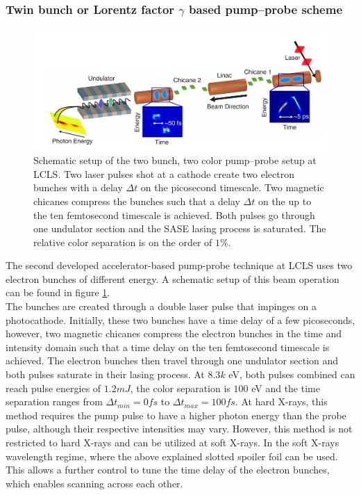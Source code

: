 \subsubsection{Twin bunch or Lorentz factor $\gamma$ based pump--probe scheme}
\begin{figure}
	\centering
		\includegraphics[width=1.00\textwidth]{images/Agos-pump-probe-scheme.png}
	\caption{Schematic setup of the two bunch, two color pump--probe setup at LCLS. Two laser pulses shot at a cathode create two electron bunches with a delay $\Delta t$ on the picosecond timescale. Two magnetic chicanes compress the bunches such that a delay $\Delta t$ on the up to the ten femtosecond timescale is achieved. Both pulses go through one undulator section and the SASE lasing process is saturated. The relative color separation is on the order of $1\%$.}
	\label{fig:Agos-pump-probe-scheme}
\end{figure}
The second developed accelerator-based pump-probe technique at LCLS \cite{Marinelli-2015-NatComm} uses two electron bunches of different energy. A schematic setup of this beam operation can be found in figure \ref{fig:Agos-pump-probe-scheme}.\\
The bunches are created through a double laser pulse that impinges on a photocathode. Initially, these two bunches have a time delay of a few picoseconds, however, two magnetic chicanes compress the electron bunches in the time and intensity domain such that a time delay on the ten femtosecond timescale is achieved. The electron bunches then travel through one undulator section and both pulses saturate in their lasing process. At $8.3k$ eV, both pulses combined can reach pulse energies of $1.2mJ$, the color separation is $100$ eV and the time separation ranges from $\Delta t_{min}=0fs$ to $\Delta t_{max}=100fs$. At hard X-rays, this method requires the pump pulse to have a higher photon energy than the probe pulse, although their respective intensities may vary. However, this method is not restricted to hard X-rays and can be utilized at soft X-rays. In the soft X-rays wavelength regime, where the above explained slotted spoiler foil can be used. This allows a further control to tune the time delay of the electron bunches, which enables scanning across each other.
